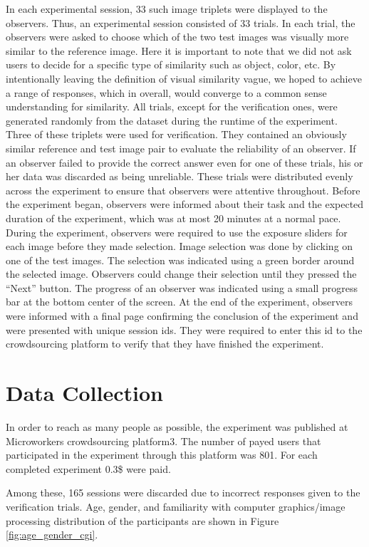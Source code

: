 In each experimental session, 33 such image triplets were displayed to the observers. Thus, an experimental session consisted of 33 trials. In each trial, the observers were asked to choose which of the two test images was visually more similar to the reference image. Here it is important to note that we did not ask users
to decide for a specific type of similarity such as object, color, etc. By intentionally leaving the definition of visual similarity vague, we hoped to achieve a range of responses, which in overall, would converge to a common sense understanding for similarity. All trials, except for the verification ones, were generated randomly from the dataset during the runtime of the experiment. Three of these triplets were used for verification. They contained an obviously similar reference and test image pair to evaluate the reliability of an observer. If an observer failed to provide the correct answer even for one of these trials, his or her data was discarded as being unreliable. These trials were distributed evenly across the experiment to ensure that observers were attentive throughout. Before the experiment began, observers were informed about their task and the expected duration of the experiment, which was at most 20 minutes at a normal pace. During the experiment, observers were required to use the exposure sliders for each image before they made selection. Image selection was done by clicking on one of the test images. The selection was indicated using a green border around the selected image. Observers could change their selection until they pressed the “Next” button. The progress of an observer was indicated using a small progress bar at the bottom center of the screen. At the end of the experiment, observers were informed with a final page confirming the conclusion of the experiment and were presented with unique session ids. They were required to enter this id to the crowdsourcing platform to verify that they have finished the experiment.
\section{Data Collection}
In order to reach as many people as possible, the experiment was published at Microworkers crowdsourcing platform3. The number of payed users that participated in the experiment through this platform was 801. For each completed experiment 0.3\$ were paid.

Among these, 165 sessions were discarded due to incorrect responses given to the verification trials. Age, gender, and familiarity with computer graphics/image processing distribution of the participants are shown in Figure \ref{fig:age_gender_cgi}.

